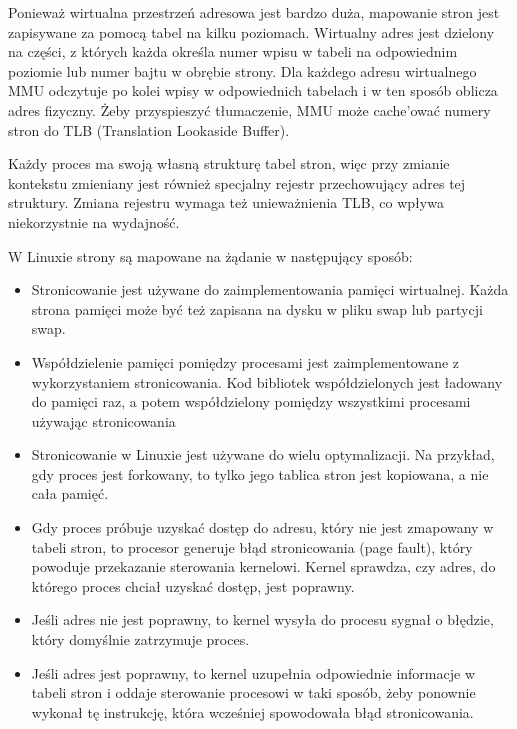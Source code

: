 Ponieważ wirtualna przestrzeń adresowa jest bardzo duża, mapowanie stron jest zapisywane za pomocą tabel na kilku poziomach. Wirtualny adres jest dzielony na części, z których każda określa numer wpisu w tabeli na odpowiednim poziomie lub numer bajtu w obrębie strony. Dla każdego adresu wirtualnego MMU odczytuje po kolei wpisy w odpowiednich tabelach i w ten sposób oblicza adres fizyczny. Żeby przyspieszyć tłumaczenie, MMU może cache'ować numery stron do TLB (Translation Lookaside Buffer).

Każdy proces ma swoją własną strukturę tabel stron, więc przy zmianie kontekstu zmieniany jest również specjalny rejestr przechowujący adres tej struktury. Zmiana rejestru wymaga też unieważnienia TLB, co wpływa niekorzystnie na wydajność.

W Linuxie strony są mapowane na żądanie w następujący sposób:
\begin{itemize}
    \item Stronicowanie jest używane do zaimplementowania pamięci wirtualnej. Każda strona pamięci może być też zapisana na dysku w pliku swap lub partycji swap.
    \item Współdzielenie pamięci pomiędzy procesami jest zaimplementowane z wykorzystaniem stronicowania. Kod bibliotek współdzielonych jest ładowany do pamięci raz, a potem współdzielony pomiędzy wszystkimi procesami używając stronicowania
    \item Stronicowanie w Linuxie jest używane do wielu optymalizacji. Na przykład, gdy proces jest forkowany, to tylko jego tablica stron jest kopiowana, a nie cała pamięć.
    \item Gdy proces próbuje uzyskać dostęp do adresu, który nie jest zmapowany w tabeli stron, to procesor generuje błąd stronicowania (page fault), który powoduje przekazanie sterowania kernelowi. Kernel sprawdza, czy adres, do którego proces chciał uzyskać dostęp, jest poprawny.
    \item Jeśli adres nie jest poprawny, to kernel wysyła do procesu sygnał o błędzie, który domyślnie zatrzymuje proces.
    \item Jeśli adres jest poprawny, to kernel uzupełnia odpowiednie informacje w tabeli stron i oddaje sterowanie procesowi w taki sposób, żeby ponownie wykonał tę instrukcję, która wcześniej spowodowała błąd stronicowania.
\end{itemize}